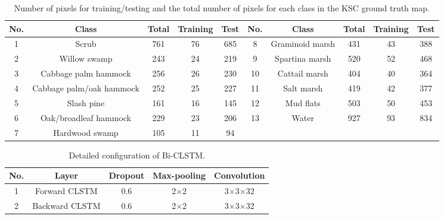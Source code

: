 \documentclass[12pt,onecolumn]{IEEEtran}
\begin{document}
\begin{spacing}{2}
\begin{table}\small
\centering
\caption{Number of pixels for training/testing and the total number of pixels for each class in the KSC ground truth map.}
\label{KSCT}
\begin{tabular}{|c|c|c|c|c|c|c|c|c|c|}
\hline
No.  &  Class                    & Total           & Training  & Test  & No.  & Class             & Total          & Training & Test        \\ \hline
1    & Scrub                      &   761        &   76       &  685   &  8   & Graminoid marsh  &  431      & 43        &  388         \\\hline
2    & Willow swamp               &   243          &   24     &  219 &  9  & Spartina marsh      &  520      & 52       &  468        \\\hline
3    & Cabbage palm hammock       &   256          &   26      &  230  &  10  & Cattail marsh    &  404       & 40      &  364       \\\hline
4    & Cabbage palm/oak hammock   &    252         &   25      &  227  &  11  & Salt marsh       &  419      & 42       &  377        \\\hline
5    & Slash pine                 &   161          &   16      &  145  &  12  & Mud flats        &  503       & 50       &  453        \\\hline
6    & Oak/broadleaf hammock      &   229           &   23      &  206  &  13  & Water           &  927          & 93      &  834       \\\hline
7    &  Hardwood swamp            &   105          &   11       &  94   &      &                &                &           &  \\ \hline
\end{tabular}
\end{table}

\begin{table}\small
\centering
\caption{Detailed configuration of Bi-CLSTM.}
\label{configuration}
\begin{tabular}{|c|c|c|c|c|}
\hline
No.  &  Layer                     & Dropout        & Max-pooling       & Convolution                               \\ \hline
1    & Forward CLSTM              & 0.6            &  2$\times$2       & 3$\times$3$\times$32                      \\ \hline
2    & Backward CLSTM             & 0.6            &  2$\times$2       & 3$\times$3$\times$32                      \\ \hline
\end{tabular}
\end{table}


\end{spacing}
\end{document}
